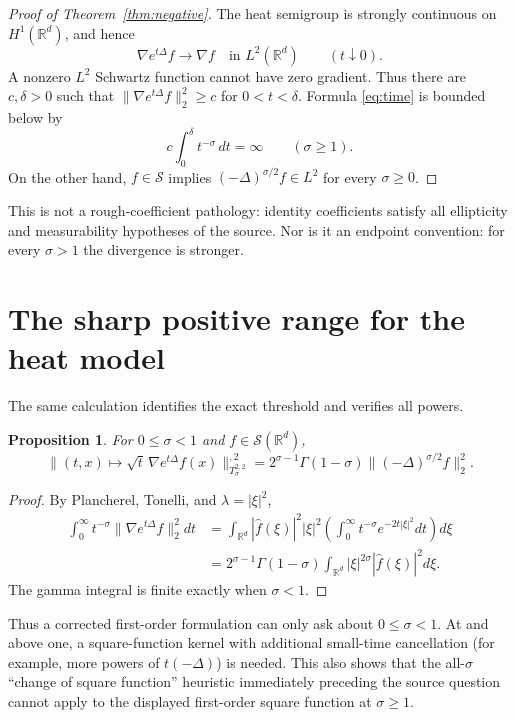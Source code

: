 \documentclass[10pt]{article}
\newtheorem{proposition}{Proposition}
\newcommand{\R}{\mathbb R}
\newcommand{\cS}{\mathcal S}
\begin{document}
\begin{proof}[Proof of Theorem~\ref{thm:negative}]
The heat semigroup is strongly continuous on $H^1(\R^d)$, and hence
\[
 \nabla e^{t\Delta}f\longrightarrow\nabla f
 \quad\text{in }L^2(\R^d)\qquad(t\downarrow0).
\]
A nonzero $L^2$ Schwartz function cannot have zero gradient. Thus there are
$c,\delta>0$ such that
$\|\nabla e^{t\Delta}f\|_2^2\geq c$ for $0<t<\delta$. Formula
\eqref{eq:time} is bounded below by
\[
 c\int_0^\delta t^{-\sigma}\,dt=\infty
 \qquad(\sigma\geq1).
\]
On the other hand, $f\in\cS$ implies
$(-\Delta)^{\sigma/2}f\in L^2$ for every $\sigma\geq0$.
\end{proof}

This is not a rough-coefficient pathology: identity coefficients satisfy all
ellipticity and measurability hypotheses of the source. Nor is it an endpoint
convention: for every $\sigma>1$ the divergence is stronger.

\section{The sharp positive range for the heat model}

The same calculation identifies the exact threshold and verifies all powers.

\begin{proposition}\label{prop:positive}
For $0\leq\sigma<1$ and $f\in\cS(\R^d)$,
\begin{equation}\label{eq:exact}
 \|(t,x)\mapsto\sqrt t\,\nabla e^{t\Delta}f(x)\|_{T^{2,2}_\sigma}^{,2}
 =2^{\sigma-1}\Gamma(1-\sigma)
 \|(-\Delta)^{\sigma/2}f\|_2^2.
\end{equation}
\end{proposition}

\begin{proof}
By Plancherel, Tonelli, and $\lambda=|\xi|^2$,
\begin{align*}
 \int_0^\infty t^{-\sigma}\|\nabla e^{t\Delta}f\|_2^2dt
 &=\int_{\R^d}|\widehat f(\xi)|^2|\xi|^2
   \left(\int_0^\infty t^{-\sigma}e^{-2t|\xi|^2}dt\right)d\xi\\
 &=2^{\sigma-1}\Gamma(1-\sigma)
   \int_{\R^d}|\xi|^{2\sigma}|\widehat f(\xi)|^2d\xi.
\end{align*}
The gamma integral is finite exactly when $\sigma<1$.
\end{proof}

Thus a corrected first-order formulation can only ask about
$0\leq\sigma<1$. At and above one, a square-function kernel with additional
small-time cancellation (for example, more powers of $t(-\Delta)$) is needed.
This also shows that the all-$\sigma$ ``change of square function'' heuristic
immediately preceding the source question cannot apply to the displayed
first-order square function at $\sigma\geq1$.
\end{document}
